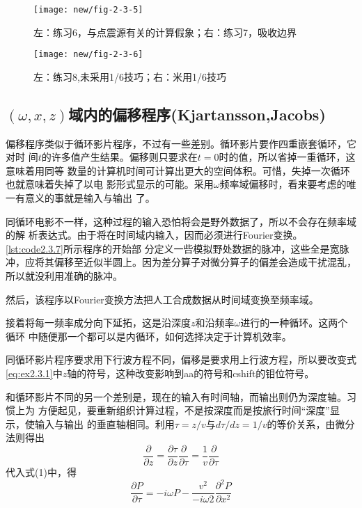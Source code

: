 \begin{figure}[H]
\centering
\texttt{[image: new/fig-2-3-5]}
\caption[2-3-5]{左：练习6，与点震源有关的计算假象；右：练习7，吸收边界}
\label{fig:new/fig-2-3-5}
\end{figure}

\begin{figure}[H]
\centering
\texttt{[image: new/fig-2-3-6]}
\caption[2-3-6]{左：练习8,未采用1/6技巧；右：米用1/6技巧}
\label{fig:new/fig-2-3-6}
\end{figure}

\subsection{$(\omega,x,z)$域内的偏移程序(Kjartansson,Jacobs)}
偏移程序类似于循环影片程序，不过有一些差别。循环影片要作四重嵌套循环，它对时
间$t$的许多值产生结果。偏移则只要求在$t=0$时的值，所以省掉一重循环，这意味着用同等
数量的计算机时间可计算出更大的空间体积。可惜，失掉一次循环也就意味着失掉了以电
影形式显示的可能。采用$\omega$频率域偏移时，看来要考虑的唯一有意义的事就是输入与输出
了。

同循环电影不一样，这种过程的输入恐怕将会是野外数据了，所以不会存在频率域的解
析表达式。由于将在时间域内输入，因而必须进行Fourier变换。\ref{lst:code2.3.7}所示程序的开始部
分定义一呰模拟野处数据的脉冲，这些全是宽脉冲，应将其偏移至近似半圆上。因为差分算子对微分算子的偏差会造成干扰混乱，所以就没利用准确的脉冲。

然后，该程序以Fourier变换方法把人工合成数据从时间域变换至频率域。

接着将每一频率成分向下延拓，这是沿深度$z$和沿频率$\omega$进行的一种循环。这两个循环
中随便那一个都可以是内循环，如何选择决定于计算机效率。

同循环影片程序要求用下行波方程不同，偏移是要求用上行波方程，所以要改变式
\ref{eq:ex2.3.1}中$z$轴的符号，这种改变影响到aa的符号和cshift的钼位符号。

和循环影片不同的另一个差别是，现在的输入有时间轴，而输出则仍为深度轴。习惯上为
方便起见，要重新组织计算过程，不是按深度而是按旅行时间“深度”显示，使输入与输出
的垂直轴相同。利用$\tau=z/v$与$d\tau/dz=1/v$的等价关系，由微分法则得出
\begin{equation}
\frac{\partial}{\partial z}=\frac{\partial\tau}{\partial z}\frac{\partial}{\partial \tau}=\frac{1}{v}\frac{\partial}{\partial \tau}
\label{eq:2.3.7}
\end{equation}
代入式(1)中，得
\begin{equation}
\frac{\partial P}{\partial \tau}= -i\omega P-\frac{v^2}{-i\omega 2}\frac{\partial^2 P}{\partial x^2}
\label{eq:2.3.8}
\end{equation}

